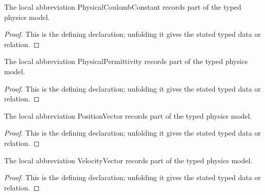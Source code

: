 \begin{definition}[PhysicalCoulombConstant]
  \label{decl:physics:IPhO_2026_1_B_1:PhysicalCoulombConstant}
  The local abbreviation PhysicalCoulombConstant records part of the typed physics model.
\end{definition}
\begin{proof}
  This is the defining declaration; unfolding it gives the stated typed data or relation.
\end{proof}

\begin{definition}[PhysicalPermittivity]
  \label{decl:physics:IPhO_2026_1_B_1:PhysicalPermittivity}
  The local abbreviation PhysicalPermittivity records part of the typed physics model.
\end{definition}
\begin{proof}
  This is the defining declaration; unfolding it gives the stated typed data or relation.
\end{proof}

\begin{definition}[PositionVector]
  \label{decl:physics:IPhO_2026_1_B_1:PositionVector}
  The local abbreviation PositionVector records part of the typed physics model.
\end{definition}
\begin{proof}
  This is the defining declaration; unfolding it gives the stated typed data or relation.
\end{proof}

\begin{definition}[VelocityVector]
  \label{decl:physics:IPhO_2026_1_B_1:VelocityVector}
  The local abbreviation VelocityVector records part of the typed physics model.
\end{definition}
\begin{proof}
  This is the defining declaration; unfolding it gives the stated typed data or relation.
\end{proof}

